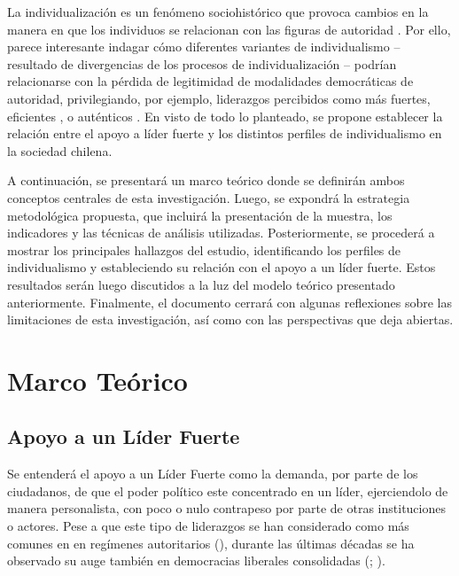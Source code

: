 \documentclass[12pt,twoside]{templates/facsothesis}
\begin{document}
La individualización es un fenómeno sociohistórico que provoca cambios en la manera en que los individuos se relacionan con las figuras de autoridad \citep{araujo2021}. Por ello, parece interesante indagar cómo diferentes variantes de individualismo -- resultado de divergencias de los procesos de individualización -- podrían relacionarse con la pérdida de legitimidad de modalidades democráticas de autoridad, privilegiando, por ejemplo, liderazgos percibidos como más fuertes, eficientes \citep{araujo2022, araujo2022a}, o auténticos \citep{gauthier2021}. En visto de todo lo planteado, se propone establecer la relación entre el apoyo a líder fuerte y los distintos perfiles de individualismo en la sociedad chilena.

A continuación, se presentará un marco teórico donde se definirán ambos conceptos centrales de esta investigación. Luego, se expondrá la estrategia metodológica propuesta, que incluirá la presentación de la muestra, los indicadores y las técnicas de análisis utilizadas. Posteriormente, se procederá a mostrar los principales hallazgos del estudio, identificando los perfiles de individualismo y estableciendo su relación con el apoyo a un líder fuerte. Estos resultados serán luego discutidos a la luz del modelo teórico presentado anteriormente. Finalmente, el documento cerrará con algunas reflexiones sobre las limitaciones de esta investigación, así como con las perspectivas que deja abiertas.

\hypertarget{marco-teuxf3rico}{%
\chapter{Marco Teórico}\label{marco-teuxf3rico}}

\hypertarget{apoyo-a-un-luxedder-fuerte}{%
\section{Apoyo a un Líder Fuerte}\label{apoyo-a-un-luxedder-fuerte}}

Se entenderá el apoyo a un Líder Fuerte como la demanda, por parte de los ciudadanos, de que el poder político este concentrado en un líder, ejerciendolo de manera personalista, con poco o nulo contrapeso por parte de otras instituciones o actores. Pese a que este tipo de liderazgos se han considerado como más comunes en en regímenes autoritarios (\citet{kendall-taylor2017}), durante las últimas décadas se ha observado su auge también en democracias liberales consolidadas (\citet{lindstaedt2021}; \citet{kendall-taylor2017}).
\end{document}
